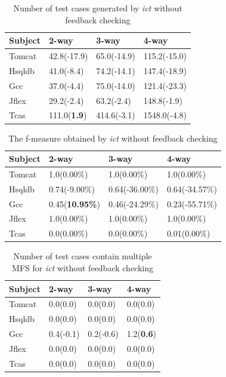 \documentclass[journal,12pt,onecolumn,draftclsnofoot,]{IEEEtran}
\begin{document}
\begin{table}[ht]
\caption{Number of test cases generated by \emph{ict} without feedback checking}
\label{tests-ict-nonfb}
\centering
    \begin{tabular}{|l|l|l|l|}
    \hline
 Subject      & 2-way                     & 3-way                     & 4-way                       \\ \hline
Tomcat	&42.8(-17.9)	&65.0(-14.9)	&115.2(-15.0)	\\
Hsqldb	&41.0(-8.4)	&74.2(-14.1)	&147.4(-18.9)	\\
Gcc	&37.0(-4.4)	&75.0(-14.0)	&121.4(-23.3)	\\
Jflex	&29.2(-2.4)	&63.2(-2.4)	&148.8(-1.9)	\\
Tcas	&111.0(\textbf{1.9})	&414.6(-3.1)	&1548.0(-4.8)	\\\hline
    \end{tabular}
\end{table}

\begin{table}[ht]
\caption{The f-measure obtained by \emph{ict} without feedback checking}
\label{fm-ict-nonfb}
\centering
    \begin{tabular}{|l|l|l|l|}
    \hline
 Subject      & 2-way                     & 3-way                     & 4-way                       \\ \hline
Tomcat	&1.0(0.00\%)	&1.0(0.00\%)	&1.0(0.00\%)	\\
Hsqldb	&0.74(-9.00\%)	&0.64(-36.00\%)	&0.64(-34.57\%)	\\
Gcc	&0.45(\textbf{10.95\%})	&0.46(-24.29\%)	&0.23(-55.71\%)	\\
Jflex	&1.0(0.00\%)	&1.0(0.00\%)	&1.0(0.00\%)	\\
Tcas	&0.0(0.00\%)	&0.0(0.00\%)	&0.01(0.00\%)	\\\hline
    \end{tabular}
\end{table}

\begin{table}[ht]
\caption{Number of test cases contain multiple MFS for \emph{ict} without feedback checking}
\label{multi-ict-nonfb}
\centering
    \begin{tabular}{|l|l|l|l|}
    \hline
 Subject      & 2-way                     & 3-way                     & 4-way                       \\ \hline
Tomcat	&0.0(0.0)	&0.0(0.0)	&0.0(0.0)	\\
Hsqldb	&0.0(0.0)	&0.0(0.0)	&0.0(0.0)	\\
Gcc	&0.4(-0.1)	&0.2(-0.6)	&1.2(\textbf{0.6})	\\
Jflex	&0.0(0.0)	&0.0(0.0)	&0.0(0.0)	\\
Tcas	&0.0(0.0)	&0.0(0.0)	&0.0(0.0)	\\\hline
    \end{tabular}
\end{table}
\end{document}
